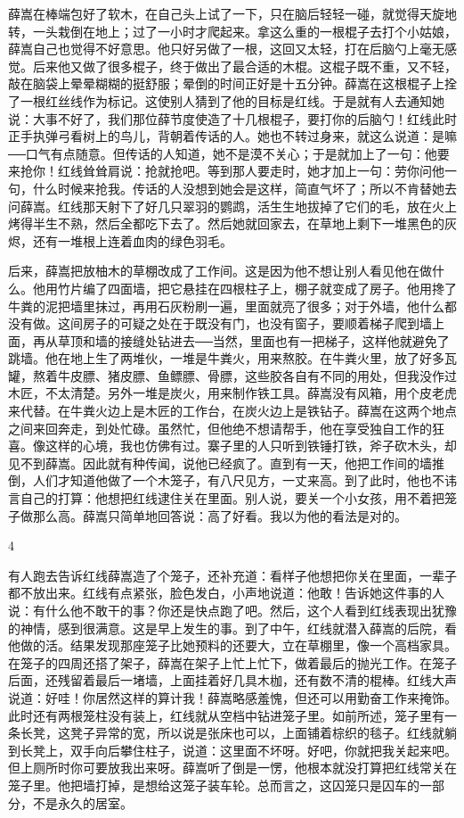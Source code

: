 薛嵩在棒端包好了软木，在自己头上试了一下，只在脑后轻轻一碰，就觉得天旋地转，一头栽倒在地上；过了一小时才爬起来。拿这么重的一根棍子去打个小姑娘，薛嵩自己也觉得不好意思。他只好另做了一根，这回又太轻，打在后脑勺上毫无感觉。后来他又做了很多棍子，终于做出了最合适的木棍。这棍子既不重，又不轻，敲在脑袋上晕晕糊糊的挺舒服；晕倒的时间正好是十五分钟。薛嵩在这根棍子上拴了一根红丝线作为标记。这使别人猜到了他的目标是红线。于是就有人去通知她说：大事不好了，我们那位薛节度使造了十几根棍子，要打你的后脑勺！红线此时正手执弹弓看树上的鸟儿，背朝着传话的人。她也不转过身来，就这么说道：是嘛──口气有点随意。但传话的人知道，她不是漠不关心；于是就加上了一句：他要来抢你！红线耸耸肩说：抢就抢吧。等到那人要走时，她才加上一句：劳你问他一句，什么时候来抢我。传话的人没想到她会是这样，简直气坏了；所以不肯替她去问薛嵩。红线那天射下了好几只翠羽的鹦鹉，活生生地拔掉了它们的毛，放在火上烤得半生不熟，然后全都吃下去了。然后她就回家去，在草地上剩下一堆黑色的灰烬，还有一堆根上连着血肉的绿色羽毛。 

后来，薛嵩把放柚木的草棚改成了工作间。这是因为他不想让别人看见他在做什么。他用竹片编了四面墙，把它悬挂在四根柱子上，棚子就变成了房子。他用搀了牛粪的泥把墙里抹过，再用石灰粉刷一遍，里面就亮了很多；对于外墙，他什么都没有做。这间房子的可疑之处在于既没有门，也没有窗子，要顺着梯子爬到墙上面，再从草顶和墙的接缝处钻进去──当然，里面也有一把梯子，这样他就避免了跳墙。他在地上生了两堆伙，一堆是牛粪火，用来熬胶。在牛粪火里，放了好多瓦罐，熬着牛皮膘、猪皮膘、鱼鳔膘、骨膘，这些胶各自有不同的用处，但我没作过木匠，不太清楚。另外一堆是炭火，用来制作铁工具。薛嵩没有风箱，用个皮老虎来代替。在牛粪火边上是木匠的工作台，在炭火边上是铁钻子。薛嵩在这两个地点之间来回奔走，到处忙碌。虽然忙，但他绝不想请帮手，他在享受独自工作的狂喜。像这样的心境，我也仿佛有过。寨子里的人只听到铁锤打铁，斧子砍木头，却见不到薛嵩。因此就有种传闻，说他已经疯了。直到有一天，他把工作间的墙推倒，人们才知道他做了一个木笼子，有八尺见方，一丈来高。到了此时，他也不讳言自己的打算：他想把红线逮住关在里面。别人说，要关一个小女孩，用不着把笼子做那么高。薛嵩只简单地回答说：高了好看。我以为他的看法是对的。 

4 

有人跑去告诉红线薛嵩造了个笼子，还补充道：看样子他想把你关在里面，一辈子都不放出来。红线有点紧张，脸色发白，小声地说道：他敢！告诉她这件事的人说：有什么他不敢干的事？你还是快点跑了吧。然后，这个人看到红线表现出犹豫的神情，感到很满意。这是早上发生的事。到了中午，红线就潜入薛嵩的后院，看他做的活。结果发现那座笼子比她预料的还要大，立在草棚里，像一个高档家具。在笼子的四周还搭了架子，薛嵩在架子上忙上忙下，做着最后的抛光工作。在笼子后面，还残留着最后一堵墙，上面挂着好几具木枷，还有数不清的棍棒。红线大声说道：好哇！你居然这样的算计我！薛嵩略感羞愧，但还可以用勤奋工作来掩饰。此时还有两根笼柱没有装上，红线就从空档中钻进笼子里。如前所述，笼子里有一条长凳，这凳子异常的宽，所以说是张床也可以，上面铺着棕织的毯子。红线就躺到长凳上，双手向后攀住柱子，说道：这里面不坏呀。好吧，你就把我关起来吧。但上厕所时你可要放我出来呀。薛嵩听了倒是一愣，他根本就没打算把红线常关在笼子里。他把墙打掉，是想给这笼子装车轮。总而言之，这囚笼只是囚车的一部分，不是永久的居室。 

